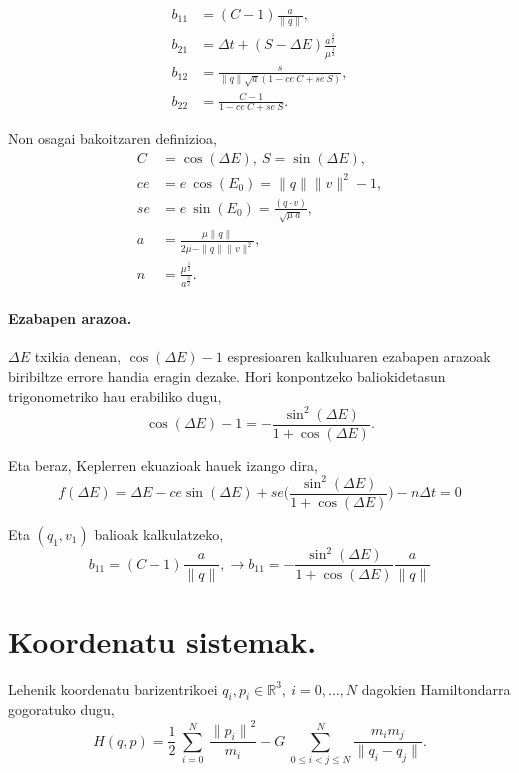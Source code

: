\begin{align*}
b_{11} &=(C-1) \frac{a}{\|q\|}, \\
b_{21} &=\Delta t+(S-\Delta E) \frac{a^{\frac{3}{2}}}{\mu^{\frac{1}{2}}} \\
b_{12} &=\frac{s}{\|q\| \sqrt{a} (1-ce \ C +se \ S)}, \\
b_{22} &=\frac{C-1}{1-ce \ C+ se \ S}. 
\end{align*}

Non osagai bakoitzaren definizioa,
\begin{align*}
C &=\cos(\Delta E), \ S=\sin(\Delta E), \\
ce &=e \ \cos(E_0) = \|q\| \|v\|^2-1, \\
se &= e \ \sin(E_0)=\frac{(q \cdot v)}{\sqrt{\mu \ a}}, \\
a &= \frac{\mu \|q\|}{2\mu-\|q\|\|v\|^2}, \\
n &= \frac{\mu^{\frac{1}{2}}}{a^{\frac{3}{2}}}.
\end{align*}

\paragraph*{Ezabapen arazoa.} $\Delta E$ txikia denean, $\cos(\Delta E)-1$ espresioaren kalkuluaren ezabapen arazoak biribiltze errore handia eragin dezake. Hori konpontzeko baliokidetasun trigonometriko hau erabiliko dugu,
\begin{equation*}
\cos(\Delta E)-1=-\frac{\sin^2(\Delta E)}{1+\cos(\Delta E)}.
\end{equation*}  

Eta beraz, Keplerren ekuazioak hauek izango dira,
\begin{equation*}
f(\Delta E)=\Delta E - ce \sin(\Delta E)+ se \bigg(\frac{\sin^2(\Delta E)}{1+\cos(\Delta E)}\bigg)-n \Delta t=0
\end{equation*}

Eta $(q_1,v_1)$ balioak kalkulatzeko,
\begin{equation*}
b_{11}=(C-1) \frac{a}{\|q\|}, \longrightarrow b_{11}=-\frac{\sin^2(\Delta E)}{1+\cos(\Delta E)} \frac{a}{\|q\|}
\end{equation*}

\section{Koordenatu sistemak.}
\label{erans:B2}

Lehenik koordenatu barizentrikoei $q_i, p_i \in \mathbb{R}^3, \ i=0,\dots,N$ dagokien Hamiltondarra gogoratuko dugu,
\begin{equation}
H(q,p)=\frac{1}{2}\ \sum^N_{i=0}{\ \frac{{\|p_i\|}^2}{m_i}}-G\ \sum^N_{0\le i<j\le N}{\frac{m_im_j}{\|q_i-q_j\|}}.
\end{equation}

